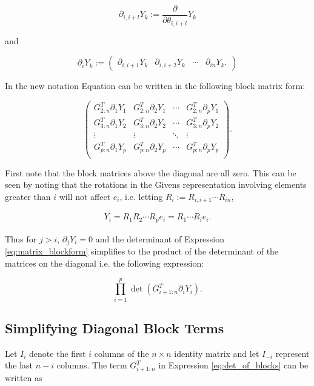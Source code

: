 \documentclass[ba]{imsart}
\numberwithin{equation}{section}
\theoremstyle{plain}
\begin{document}
\begin{equation}
\partial_{i,i+l} Y_k := \frac{\partial}{\partial \theta_{i,i+l}} Y_k
\end{equation}

\noindent and

\begin{equation}
\partial_{i} Y_k
:=
\begin{pmatrix}
\partial_{i,i+1} Y_k & \partial_{i,i+2} Y_k & \cdots & \partial_{in} Y_k.
\end{pmatrix}
\end{equation}

\noindent In the new notation Equation can be written in the following block matrix form:

\begin{equation}
\label{eq:matrix_blockform}
\begin{pmatrix}
G_{2:n}^T \partial_{1} Y_1 &G_{2:n}^T \partial_{2} Y_1 & \cdots & G_{2:n}^T \partial_{p} Y_1\\
G_{3:n}^T \partial_{1} Y_2 &G_{3:n}^T \partial_{2} Y_2 & \cdots & G_{3:n}^T \partial_{p} Y_2\\
\vdots & \vdots & \ddots & \vdots\\
G_{p:n}^T \partial_{1} Y_p &G_{p:n}^T \partial_{2} Y_p & \cdots & G_{p:n}^T \partial_{p} Y_p\\
\end{pmatrix}.
\end{equation}

\noindent First note that the block matrices above the diagonal are all zero.  This can be seen by noting that the rotations in the Givens representation involving elements greater than $i$ will not affect $e_i$, i.e. letting $R_i := R_{i,i+1} \cdots R_{in}$,

\begin{eqnarray}
Y_i = R_1 R_2 \cdots R_p e_i = R_1 \cdots R_i e_i.
\end{eqnarray}

\noindent Thus for $j > i$, $\partial_j Y_i = 0$ and the determinant of Expression \ref{eq:matrix_blockform} simplifies to the product of the determinant of the matrices on the diagonal i.e. the following expression:

\begin{equation}
\label{eq:det_of_blocks}
\prod_{i=1}^p \det \left( G_{i+1:n}^T \partial_{i} Y_i \right).
\end{equation}

\subsection{Simplifying Diagonal Block Terms}
Let $I_{i}$ denote the first $i$ columns of the $n \times n$ identity matrix and let $I_{-i}$ represent the last $n-i$ columns. The term $G_{i+1:n}^T$ in Expression \ref{eq:det_of_blocks} can be written as
\end{document}
